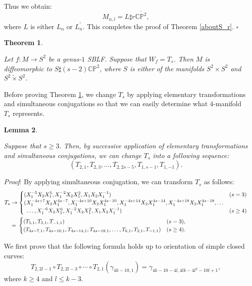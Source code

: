 \documentclass{amsart}
\theoremstyle{plain}
\newtheorem{thm}{Theorem}[section]
\newtheorem{lem}[thm]{Lemma}
\theoremstyle{definition}
\begin{document}
Thus we obtain: 
\[
M_{n,l}=L\sharp r\overline{\mathbb{CP}^2}, 
\]
where $L$ is either $L_n$ or $L_n^\prime$. 
This completes the proof of Theorem \ref{aboutS_r}.  \hfill $\square$

\begin{thm}\label{aboutT_s}

Let $f:M\rightarrow S^2$ be a genus-$1$ SBLF. 
Suppose that $W_f=T_s$. 
Then $M$ is diffeomorphic to $S\sharp (s-2)\mathbb{CP}^2$, where $S$ is either of the manifolds $S^2\times S^2$ and $S^2\tilde{\times}S^2$. 

\end{thm}

Before proving Theorem \ref{aboutT_s}, we change $T_s$ by applying elementary transformations and simultaneous conjugations 
so that we can easily determine what $4$-manifold $T_s$ represents. 

\begin{lem}\label{transT_s}

Suppose that $s\geq 3$. 
Then, by successive application of elementary transformations and simultaneous conjugations, we can change $T_s$ into a following sequence: 
\[
(T_{2,1},T_{2,3},\ldots,T_{2,2s-5},T_{1,s-1},T_{1,-1}). 
\]

\end{lem}

{\it Proof}: By applying simultaneous conjugation, we can transform $T_s$ as follows: 
{\allowdisplaybreaks
\begin{align*}
T_s & \rightarrow\begin{cases}
(X_1^{-5}X_2X_1^{5},X_1^{-2}X_2X_1^2,X_1X_2X_1^{-1}) & (s=3) \\
(X_1^{-4s+7}X_2X_1^{4s-7},X_1^{-4s+10}X_2X_1^{4s-10},X_1^{-4s+14}X_2X_1^{4s-14},X_1^{-4s+18}X_2X_1^{4s-18},\ldots \\
\hspace{.5em}\ldots ,X_1^{-6}X_2X_1^6,X_1^{-2}X_2X_1^2,X_1X_2X_1^{-1}) & (s\geq 4) 
\end{cases} \\
& = \hspace{.2em}\begin{cases}
(T_{5,1},T_{2,1},T_{-1,1}) & (s=3), \\
(T_{4s-7,1},T_{4s-10,1},T_{4s-14,1},T_{4s-18,1},\ldots,T_{6,1},T_{2,1},T_{-1,1}) & (s\geq 4). 
\end{cases}
\end{align*}
}

We first prove that the following formula holds up to orientation of simple closed curves: 
\begin{equation}\label{scc1}
T_{2,2l-1}\circ T_{2,2l-3}\circ\cdots\circ T_{2,1}(\gamma_{4k-10,1})=\gamma_{4k-10-4l,4lk-4l^2-10l+1}, 
\end{equation}
where $k\geq 4$ and $l\leq k-3$. 
\end{document}
